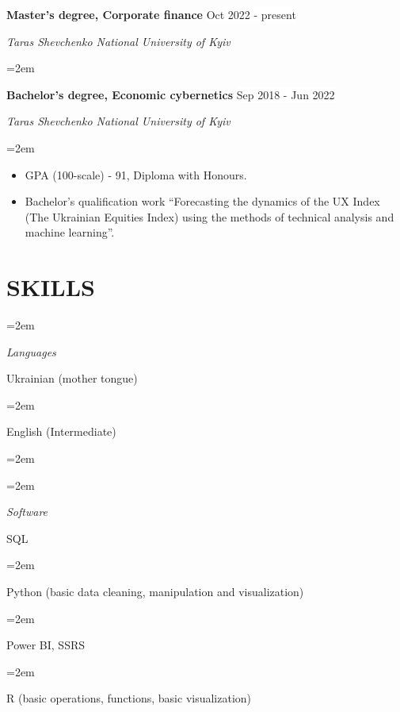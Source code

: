 \documentclass[paper=a4,fontsize=11pt]{scrartcl} %
\newlength{\spacebox}
\newcommand{\sepspace}{\vspace*{1em}}		%
\newcommand{\NewPart}[1]{\section*{\uppercase{#1}}}
\newcommand{\PersonalEntry}[2]{
		\noindent\hangindent=2em\hangafter=0 %
		\parbox{\spacebox}{        %
		\textit{#1}}		       %
		\hspace{1.5em} #2 \par}    %
\newcommand{\SkillsEntry}[2]{      %
		\noindent\hangindent=2em\hangafter=0 %
		\parbox{\spacebox}{        %
		\textit{#1}}			   %
		\hspace{1.5em} #2 \par}    %
\newcommand{\EducationEntry}[4]{
		\noindent \textbf{#1} \hfill      %
        \colorbox{White}{\color{Black}#2} \par  %
		\noindent \textit{#3} \par        %
		\noindent\hangindent=2em\hangafter=0 \small #4 %
		\normalsize \par}
\begin{document}
\EducationEntry{Master's degree, Corporate finance}{Oct 2022 - present}{Taras Shevchenko National University of Kyiv}
\sepspace

\EducationEntry{Bachelor's degree, Economic cybernetics}{Sep 2018 - Jun 2022}{Taras Shevchenko National University of Kyiv}{\begin{itemize} \setlength{\itemsep}{0pt} \item[\textcolor{white}{\textbullet}]  GPA (100-scale) - 91, Diploma with Honours. \item[\textcolor{white}{\textbullet}] Bachelor's qualification work “Forecasting the dynamics of the UX Index (The Ukrainian Equities Index) using the methods of technical analysis and machine learning”.\end{itemize}}

\NewPart{Skills}{}

\SkillsEntry{Languages}{Ukrainian (mother tongue)}
\SkillsEntry{}{English (Intermediate)}
\SkillsEntry{}{}
\SkillsEntry{Software}{SQL}
\SkillsEntry{}{Python (basic data cleaning, manipulation and visualization)}
\SkillsEntry{}{Power BI, SSRS}
\SkillsEntry{}{R (basic operations, functions, basic visualization)}
\end{document}
